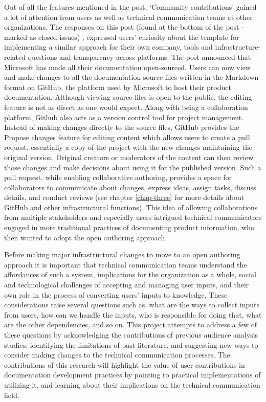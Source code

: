 Out of all the features mentioned in the post, ‘Community contributions’ gained a lot of attention from users as well as technical communication teams at other organizations. The responses on this post (found at the bottom of the post - marked as closed issues) \cite{sandquist}, expressed users’ curiosity about the template for implementing a similar approach for their own company, tools and infrastructure-related questions and transparency across platforms. The post announced that Microsoft has made all their documentation open-sourced. Users can now view and make changes to all the documentation source files written in the Markdown format on GitHub, the platform used by Microsoft to host their product documentation. Although viewing source files is open to the public, the editing feature is not as direct as one would expect. Along with being a collaboration platform, Github also acts as a version control tool for project management. Instead of making changes directly to the source files, GitHub provides the  Propose changes feature for editing content which allows users to create a pull request, essentially a copy of the project with the new changes maintaining the original version. Original creators or moderators of the content can then review those changes and make decisions about using it for the published version. Such a pull request, while enabling collaborative authoring, provides a space for collaborators to communicate about changes, express ideas, assign tasks, discuss details, and conduct reviews (see chapter \ref{chap-three} for more details about GitHub and other infrastructural functions). This idea of allowing collaborations from multiple stakeholders and especially users intrigued technical communicators engaged in more traditional practices of documenting product information, who then wanted to adopt the open authoring approach.

Before making major infrastructural changes to move to an open authoring approach it is important that technical communication teams understand the affordances of such a system, implications for the organization as a whole, social and technological challenges of accepting and managing user inputs, and their own role in the process of converting users' inputs to knowledge. These considerations raise several questions such as, what are the ways to collect inputs from users, how can we handle the inputs, who is responsible for doing that,  what are the other dependencies, and so on. This project attempts to address a few of these questions by acknowledging the contributions of previous audience analysis studies, identifying the limitations of past literature, and suggesting new ways to consider making changes to the technical communication processes. The contributions of this research will highlight the value of user contributions in documentation development practices by pointing to practical implementations of utilizing it, and learning about their implications on the technical communication field. 

